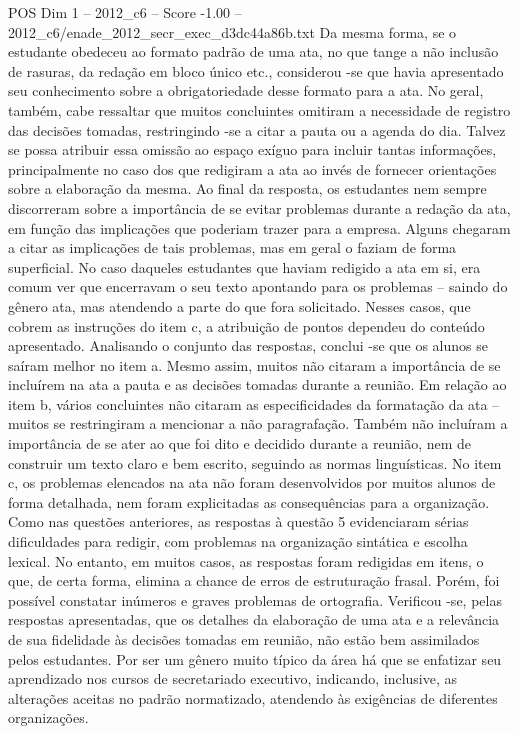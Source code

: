 \begin{textsample}{POS Dim 1 – 2012\_c6 – Score -1.00 – 2012\_c6/enade\_2012\_secr\_exec\_d3dc44a86b.txt}
Da mesma forma, se o estudante obedeceu ao formato padrão de uma ata, no que tange a não inclusão de rasuras, da redação em bloco único etc., considerou -se que havia apresentado seu conhecimento sobre a obrigatoriedade desse formato para a ata.
No geral, também, cabe ressaltar que muitos concluintes omitiram a necessidade de registro das decisões tomadas, restringindo -se a citar a pauta ou a agenda do dia.
Talvez se possa atribuir essa omissão ao espaço exíguo para incluir tantas informações, principalmente no caso dos que redigiram a ata ao invés de fornecer orientações sobre a elaboração da mesma.
Ao final da resposta, os estudantes nem sempre discorreram sobre a importância de se evitar problemas durante a redação da ata, em função das implicações que poderiam trazer para a empresa.
Alguns chegaram a citar as implicações de tais problemas, mas em geral o faziam de forma superficial.
No caso daqueles estudantes que haviam redigido a ata em si, era comum ver que encerravam o seu texto apontando para os problemas – saindo do gênero ata, mas atendendo a parte do que fora solicitado.
Nesses casos, que cobrem as instruções do item c, a atribuição de pontos dependeu do conteúdo apresentado.
Analisando o conjunto das respostas, conclui -se que os alunos se saíram melhor no item a.
Mesmo assim, muitos não citaram a importância de se incluírem na ata a pauta e as decisões tomadas durante a reunião.
Em relação ao item b, vários concluintes não citaram as especificidades da formatação da ata – muitos se restringiram a mencionar a não paragrafação.
Também não incluíram a importância de se ater ao que foi dito e decidido durante a reunião, nem de construir um texto claro e bem escrito, seguindo as normas linguísticas.
No item c, os problemas elencados na ata não foram desenvolvidos por muitos alunos de forma detalhada, nem foram explicitadas as consequências para a organização.
Como nas questões anteriores, as respostas à questão 5 evidenciaram sérias dificuldades para redigir, com problemas na organização sintática e escolha lexical.
No entanto, em muitos casos, as respostas foram redigidas em itens, o que, de certa forma, elimina a chance de erros de estruturação frasal.
Porém, foi possível constatar inúmeros e graves problemas de ortografia.
Verificou -se, pelas respostas apresentadas, que os detalhes da elaboração de uma ata e a relevância de sua fidelidade às decisões tomadas em reunião, não estão bem assimilados pelos estudantes.
Por ser um gênero muito típico da área há que se enfatizar seu aprendizado nos cursos de secretariado executivo, indicando, inclusive, as alterações aceitas no padrão normatizado, atendendo às exigências de diferentes organizações.

\end{textsample}
